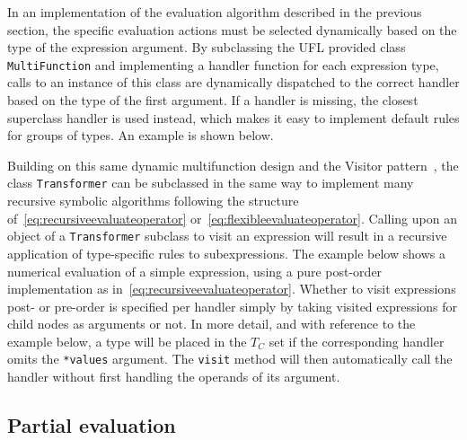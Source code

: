\documentclass[prodmode,acmtoms]{acmsmall}
\newcommand{\uflc}[1]{\texttt{#1}}
\begin{document}
In an implementation of the evaluation algorithm described in the
previous section, the specific evaluation actions must be selected
dynamically based on the type of the expression argument. By
subclassing the UFL provided class \uflc{MultiFunction} and
implementing a handler function for each expression type, calls to an
instance of this class are dynamically dispatched to the correct
handler based on the type of the first argument. If a handler is
missing, the closest superclass handler is used instead, which makes
it easy to implement default rules for groups of types. An example is
shown below.


Building on this same dynamic multifunction design and the Visitor
pattern~\citep{GammaEtAl1993}, the class \uflc{Transformer} can be
subclassed in the same way to implement many recursive symbolic
algorithms following the structure
of~\eqref{eq:recursiveevaluateoperator}
or~\eqref{eq:flexibleevaluateoperator}.  Calling upon an object of a
\uflc{Transformer} subclass to visit an expression will result in a
recursive application of type-specific rules to subexpressions.  The
example below shows a numerical evaluation of a simple expression,
using a pure post-order implementation as
in~\eqref{eq:recursiveevaluateoperator}. Whether to visit expressions
post- or pre-order is specified per handler simply by taking visited
expressions for child nodes as arguments or not. In more detail, and
with reference to the example below, a type will be placed in the
$T_C$ set if the corresponding handler omits the \uflc{*values}
argument. The \uflc{visit} method will then automatically call the
handler without first handling the operands of its argument.


\subsection{Partial evaluation}
\label{sec:partialevaluation}
\end{document}
